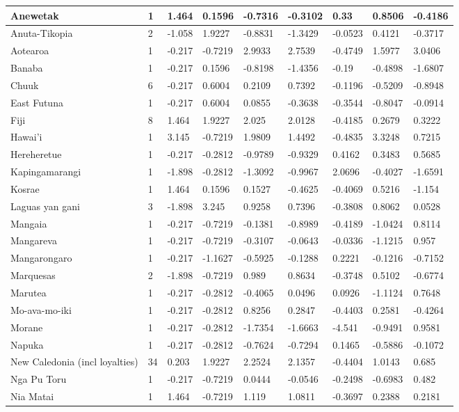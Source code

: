 \documentclass[a4paper,10pt]{article} %
\begin{document}
\begin{landscape}
\begin{longtable}{| p{2.6cm} |  p{1cm} | p{1.2cm}  | p{1.9cm}  | p{1.7cm}  | p{1.7cm}  | p{1.7cm}  | p{1.6cm} | p{1.5cm}   |}
\hline
Anewetak&1&1.464&0.1596&-0.7316&-0.3102&0.33&0.8506&-0.4186\\ \hline
Anuta-Tikopia&2&-1.058&1.9227&-0.8831&-1.3429&-0.0523&0.4121&-0.3717\\ \hline
Aotearoa&1&-0.217&-0.7219&2.9933&2.7539&-0.4749&1.5977&3.0406\\ \hline
Banaba&1&-0.217&0.1596&-0.8198&-1.4356&-0.19&-0.4898&-1.6807\\ \hline
Chuuk&6&-0.217&0.6004&0.2109&0.7392&-0.1196&-0.5209&-0.8948\\ \hline
East Futuna&1&-0.217&0.6004&0.0855&-0.3638&-0.3544&-0.8047&-0.0914\\ \hline
Fiji&8&1.464&1.9227&2.025&2.0128&-0.4185&0.2679&0.3222\\ \hline
Hawai'i&1&3.145&-0.7219&1.9809&1.4492&-0.4835&3.3248&0.7215\\ \hline
Hereheretue&1&-0.217&-0.2812&-0.9789&-0.9329&0.4162&0.3483&0.5685\\ \hline
Kapingamarangi&1&-1.898&-0.2812&-1.3092&-0.9967&2.0696&-0.4027&-1.6591\\ \hline
Kosrae&1&1.464&0.1596&0.1527&-0.4625&-0.4069&0.5216&-1.154\\ \hline
Laguas yan gani&3&-1.898&3.245&0.9258&0.7396&-0.3808&0.8062&0.0528\\ \hline
Mangaia&1&-0.217&-0.7219&-0.1381&-0.8989&-0.4189&-1.0424&0.8114\\ \hline
Mangareva&1&-0.217&-0.7219&-0.3107&-0.0643&-0.0336&-1.1215&0.957\\ \hline
Mangarongaro&1&-0.217&-1.1627&-0.5925&-0.1288&0.2221&-0.1216&-0.7152\\ \hline
Marquesas&2&-1.898&-0.7219&0.989&0.8634&-0.3748&0.5102&-0.6774\\ \hline
Marutea&1&-0.217&-0.2812&-0.4065&0.0496&0.0926&-1.1124&0.7648\\ \hline
Mo-ava-mo-iki&1&-0.217&-0.2812&0.8256&0.2847&-0.4403&0.2581&-0.4264\\ \hline
Morane&1&-0.217&-0.2812&-1.7354&-1.6663&-4.541&-0.9491&0.9581\\ \hline
Napuka&1&-0.217&-0.2812&-0.7624&-0.7294&0.1465&-0.5886&-0.1072\\ \hline
New Caledonia (incl loyalties)&34&0.203&1.9227&2.2524&2.1357&-0.4404&1.0143&0.685\\ \hline
Nga Pu Toru&1&-0.217&-0.7219&0.0444&-0.0546&-0.2498&-0.6983&0.482\\ \hline
Nia Matai&1&1.464&-0.7219&1.119&1.0811&-0.3697&0.2388&0.2181\\ \hline

\end{longtable}
\end{landscape}
\end{document}
